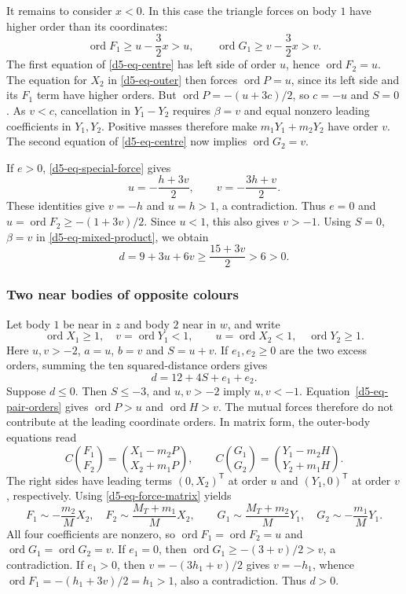 \documentclass[Threeside,11pt]{article}
\theoremstyle{definition}
\theoremstyle{remark}
\numberwithin{equation}{section}
\theoremstyle{remark}
\newcommand{\ord}{\operatorname{ord}}
\begin{document}
{It remains to consider $x<0$.  In this case the triangle forces on body $1$
have higher order than its coordinates:
\[
 \ord F_1\ge u-\frac32x>u,\qquad
 \ord G_1\ge v-\frac32x>v.
\]
The first equation of \eqref{d5-eq-centre} has left side of order $u$, hence
$\ord F_2=u$.  The equation for $X_2$ in \eqref{d5-eq-outer} then forces
$\ord P=u$, since its left side and its $F_1$ term have higher orders.
But $\ord P=-(u+3c)/2$, so $c=-u$ and $S=0$.
As $v<c$, cancellation in $Y_1-Y_2$ requires $\beta=v$ and equal nonzero
leading coefficients in $Y_1,Y_2$.  Positive masses therefore make
$m_1Y_1+m_2Y_2$ have order $v$.  The second equation of
\eqref{d5-eq-centre} now implies $\ord G_2=v$.

If $e>0$, \eqref{d5-eq-special-force} gives
\[
 u=-\frac{h+3v}{2},\qquad v=-\frac{3h+v}{2}.
\]
These identities give $v=-h$ and $u=h>1$, a contradiction.
Thus $e=0$ and
$u=\ord F_2\ge-(1+3v)/2$.  Since $u<1$, this also gives $v>-1$.
Using $S=0$, $\beta=v$ in \eqref{d5-eq-mixed-product}, we obtain
\[
 d=9+3u+6v\ge\frac{15+3v}{2}>6>0.
\]

\subsubsection{Two near bodies of opposite colours}\label{d5-opposite-near}
Let body $1$ be near in $z$ and body $2$ near in $w$, and write
\[
 \ord X_1\ge1,\quad v=\ord Y_1<1,\qquad
 u=\ord X_2<1,\quad \ord Y_2\ge1.
\]
Here $u,v>-2$, $a=u$, $b=v$ and $S=u+v$.  If $e_1,e_2\ge0$ are the two
excess orders, summing the ten squared-distance orders gives
\begin{equation*}
 d=12+4S+e_1+e_2.
\end{equation*}
Suppose $d\le0$.  Then $S\le-3$, and $u,v>-2$ imply $u,v<-1$.
Equation~\eqref{d5-eq-pair-orders} gives $\ord P>u$ and $\ord H>v$.
The mutual forces therefore do not contribute at the leading coordinate
orders.  In matrix form, the outer-body equations read
\[
 C\binom{F_1}{F_2}=\binom{X_1-m_2P}{X_2+m_1P},\qquad
 C\binom{G_1}{G_2}=\binom{Y_1-m_2H}{Y_2+m_1H}.
\]
The right sides have leading terms $(0,X_2)^{\mathsf T}$ at order $u$ and
$(Y_1,0)^{\mathsf T}$ at order $v$, respectively.  Using
\eqref{d5-eq-force-matrix} yields
\[
 F_1\sim-\frac{m_2}{M}X_2,\quad F_2\sim\frac{M_T+m_1}{M}X_2,
 \qquad
 G_1\sim\frac{M_T+m_2}{M}Y_1,\quad G_2\sim-\frac{m_1}{M}Y_1.
\]
All four coefficients are nonzero, so $\ord F_1=\ord F_2=u$ and
$\ord G_1=\ord G_2=v$.
If $e_1=0$, then $\ord G_1\ge-(3+v)/2>v$, a contradiction.
If $e_1>0$, then
$v=-(3h_1+v)/2$ gives $v=-h_1$, whence
$\ord F_1=-(h_1+3v)/2=h_1>1$, also a contradiction.
Thus $d>0$.

}
\end{document}
